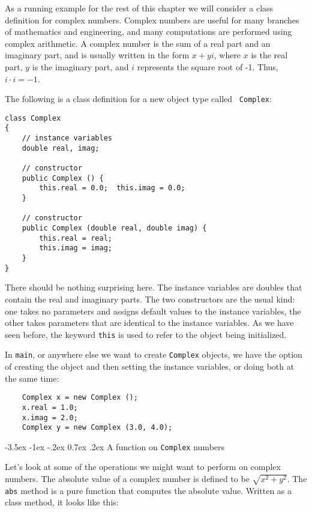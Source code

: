 \documentclass{book}
\makeatletter
\renewcommand{\section}{\@startsection 
    {section} {1} {0mm}%
    {-3.5ex \@plus -1ex \@minus -.2ex}%
    {0.7ex \@plus.2ex}%
    {\normalfont\Large\bfseries}}
\makeatother
\begin{document}
As a running example for the rest of this chapter we will consider a
class definition for complex numbers.  Complex numbers are useful for
many branches of mathematics and engineering, and many computations
are performed using complex arithmetic.  A complex number is the sum
of a real part and an imaginary part, and is usually written in the
form $x + yi$, where $x$ is the real part, $y$ is the imaginary part,
and $i$ represents the square root of -1.
Thus, $i \cdot i = -1$.

The following is a class definition for a new object type called {\tt
Complex}:

\begin{verbatim}
class Complex
{
    // instance variables
    double real, imag;

    // constructor
    public Complex () {
        this.real = 0.0;  this.imag = 0.0;
    }
	
    // constructor
    public Complex (double real, double imag) {
        this.real = real;  
        this.imag = imag;
    }
}
\end{verbatim}
%
There should be nothing surprising here.  The instance variables
are doubles that contain the real and imaginary parts.
The two constructors are the usual kind: one takes no parameters
and assigns default values to the instance variables, the other
takes parameters that are identical to the instance variables.
As we have seen before, the keyword {\tt this} is used to refer
to the object being initialized.


In {\tt main}, or anywhere else we want to create {\tt Complex}
objects, we have the option of creating the object and then
setting the instance variables, or doing both at the same time:

\begin{verbatim}
    Complex x = new Complex ();
    x.real = 1.0;
    x.imag = 2.0;
    Complex y = new Complex (3.0, 4.0);
\end{verbatim}


\section{A function on {\tt Complex} numbers}

Let's look at some of the operations we might want to perform
on complex numbers.  The absolute value of a complex number is
defined to be $\sqrt {x^2 + y^2}$.  The {\tt abs} method is
a pure function that computes the absolute value.  Written as
a class method, it looks like this:
\end{document}

